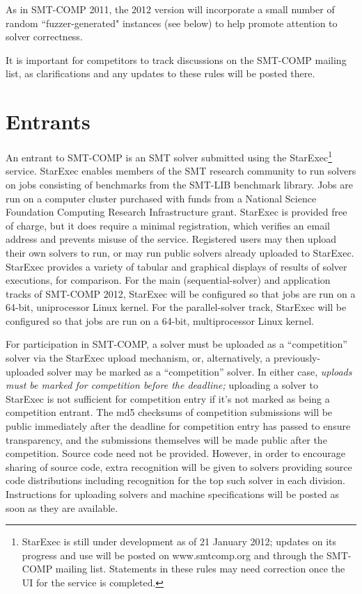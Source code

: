 \documentclass[12pt]{article}
\begin{document}
As in SMT-COMP 2011, the 2012 version will incorporate a small number of
random ``fuzzer-generated" instances (see below) to help promote
attention to solver correctness.

It is important for competitors to track discussions on the SMT-COMP mailing
list, as clarifications and any updates to these rules will be posted there.

\section{Entrants}
\label{sec:entrants}

An entrant to SMT-COMP is an SMT solver
submitted using the StarExec\footnote{StarExec is still under development as of 21 January 2012;
updates on its progress and use will be posted on www.smtcomp.org and through
the SMT-COMP mailing list. Statements in these rules may need correction once the UI for the service is completed.} service.  
StarExec enables members of the
SMT research community to run solvers on jobs consisting of benchmarks
from the SMT-LIB benchmark library.  Jobs are run on a computer
cluster purchased with funds from a National Science Foundation
Computing Research Infrastructure grant.  StarExec is provided free of
charge, but it does require a minimal registration, which verifies an
email address and prevents misuse of the service.  Registered users
may then upload their own solvers to run, or may run public solvers
already uploaded to StarExec.  StarExec provides a variety of tabular
and graphical displays of results of solver executions, for
comparison. For the main (sequential-solver)
and application tracks 
of SMT-COMP 2012, StarExec will be configured so that jobs are run on a 64-bit,
uniprocessor Linux kernel.  For the parallel-solver track, StarExec
will be configured so that jobs are run on a 64-bit, multiprocessor
Linux kernel.

For participation in SMT-COMP, a solver must be
uploaded as a ``competition'' solver via the StarExec upload
mechanism, or, alternatively, a previously-uploaded solver may be
marked as a ``competition'' solver.  In either case, \emph{uploads
must be marked for competition before the deadline;} uploading a solver
to StarExec is not sufficient for competition entry if it's not marked
as being a competition entrant.  The md5 checksums of competition
submissions will be public immediately after the deadline for competition
entry has passed to ensure transparency, and the submissions themselves
will be made public after the competition.  Source code need not be
provided.  However, in order to encourage sharing of source code, extra
recognition will be given to solvers providing source code distributions
including recognition for the top such solver in each division.  Instructions
for uploading solvers and machine specifications will be posted as soon
as they are available.
\end{document}
